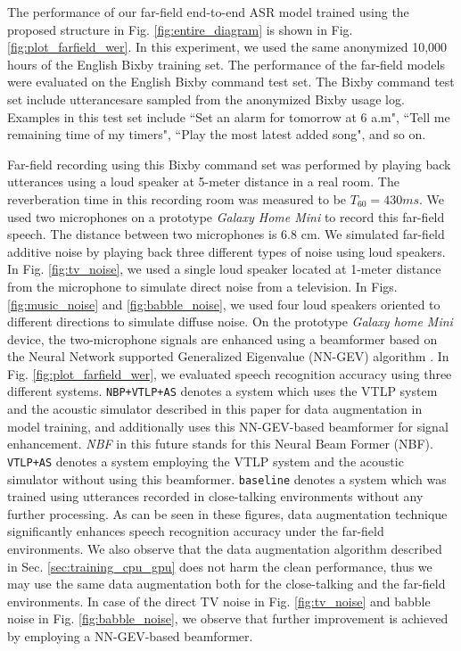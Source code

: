 \documentclass{article}
\begin{document}
%
%
The performance of our far-field end-to-end ASR model trained using the proposed
structure in Fig. \ref{fig:entire_diagram} is shown 
in Fig. \ref{fig:plot_farfield_wer}. In this experiment, we used
the same anonymized 10,000 hours of the English Bixby training set.
The performance of the far-field
models were evaluated on the English Bixby command test set.
The Bixby command test set
include utterancesare sampled from the anonymized Bixby usage log. 
Examples in this
test set include ``Set an alarm for tomorrow at 6 a.m", 
``Tell me remaining time of my timers", ``Play the most latest added 
song", and so on.

Far-field recording using this Bixby command set was performed
by playing back utterances using a loud speaker at 5-meter distance 
in a real room.
The reverberation time in this
recording room was measured to be $T_{60}=430 ms$. We used two microphones
on a prototype {\it Galaxy Home Mini} to record this far-field speech.
The distance between two microphones is 6.8 cm. We simulated 
far-field additive noise by playing back three different types of noise using loud speakers.
In Fig. \ref{fig:tv_noise}, we used a single loud speaker located at 
1-meter distance from the microphone to simulate direct noise from 
a television. In Figs. \ref{fig:music_noise} and \ref{fig:babble_noise},
we used four loud speakers oriented to different directions to simulate
diffuse noise. On the prototype {\it Galaxy home Mini} device, 
the two-microphone signals are enhanced using a beamformer 
based on the Neural Network supported
Generalized Eigenvalue (NN-GEV) algorithm \cite{j_heymann_icassp_2016_00}. 
In Fig.  \ref{fig:plot_farfield_wer}, we evaluated speech recognition accuracy
using three different systems. {\tt NBP+VTLP+AS} denotes a system
which uses the VTLP system and the acoustic simulator described in this paper for 
data augmentation in model training, and additionally uses this NN-GEV-based 
beamformer for signal enhancement. {\it NBF} in this future stands for
this Neural Beam Former (NBF).  {\tt VTLP+AS} denotes a system employing
the VTLP system and the acoustic simulator without using this beamformer.
{\tt baseline} denotes a system which was trained using utterances
recorded in close-talking environments without any further processing. 
As can be seen in these figures,
data augmentation technique significantly enhances speech recognition
accuracy under the far-field environments. We also observe that
the data augmentation algorithm described in Sec. \ref{sec:training_cpu_gpu}
does not harm the clean performance, thus we may use the same 
data augmentation both for the close-talking and the far-field environments.
In case of the direct
TV noise in Fig. \ref{fig:tv_noise} and babble noise in Fig.
\ref{fig:babble_noise}, we observe that further improvement is 
achieved by employing a NN-GEV-based beamformer.
%
%
%
%
%
\end{document}
